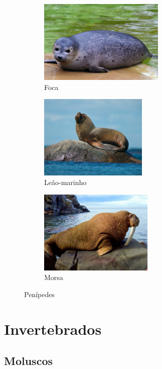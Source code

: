\documentclass{report}
\begin{document}
\begin{figure}[H]
\center
    \begin{subfigure}{.5\textwidth}
    \center
        \includegraphics[height=4cm]{imagens/foca.jpg}
        \caption{Foca}
        \label{fig:foca}
    \end{subfigure}%
    \hfill
    \begin{subfigure}{.5\textwidth}
    \center
        \includegraphics[height=4cm]{imagens/leaomarinho.jpg}
        \caption{Leão-marinho}
        \label{fig:leaomarinho}
    \end{subfigure}%
    \hfill
    \begin{subfigure}{.5\textwidth}
    \center    
        \includegraphics[height=4cm]{imagens/morsa.jpg}
        \caption{Morsa}
        \label{fig:morsa}
    \end{subfigure}
    \caption{Penípedes}
    \label{fig:penipedes}
\end{figure}

\section{Invertebrados}
\subsection{Moluscos}
\end{document}
